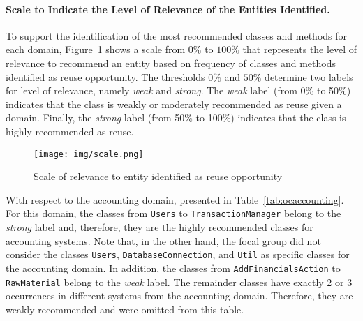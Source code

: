 \paragraph{Scale to Indicate the Level of Relevance of the Entities Identified.}  To support the identification of the most recommended classes and methods for each domain, Figure~\ref{fig:scaleClass} shows a scale from $0\%$ to $100\%$ that represents the level of relevance to recommend an entity based on frequency of classes and methods identified as reuse opportunity. The thresholds $0\%$ and $50\%$ determine two labels for level of relevance, namely \textit{weak} and \textit{strong}. The \textit{weak} label (from 0\% to 50\%) indicates that the class is weakly or moderately recommended as reuse given a domain. Finally, the \textit{strong} label (from 50\% to 100\%) indicates that the class is highly recommended as reuse.

\begin{figure}[!h]%
\centering
\texttt{[image: img/scale.png]}
\caption{Scale of relevance to entity identified as reuse opportunity}
\label{fig:scaleClass}
\end{figure} 


With respect to the accounting domain, presented in  Table~\ref{tab:ocaccounting}. For this domain, the classes from \texttt{Users} to \texttt{TransactionManager} belong to the \textit{strong} label and, therefore, they are the highly recommended classes for accounting systems. Note that, in the other hand, the focal group did not consider the classes \texttt{Users}, \texttt{DatabaseConnection}, and \texttt{Util} as specific classes for the accounting domain. In addition, the classes from \texttt{AddFinancialsAction} to \texttt{RawMaterial} belong to the \textit{weak} label. The remainder classes have exactly 2 or 3 occurrences in different systems from the accounting domain. Therefore, they are weakly recommended and were omitted from this table.


